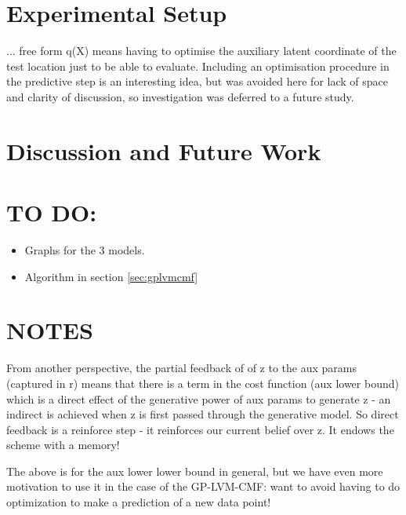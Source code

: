\documentclass{article}
\begin{document}
\section{Experimental Setup}
\label{sec:experiments}

... free form q(X) means having to optimise the auxiliary latent coordinate of the test location just to be able to evaluate. Including an optimisation procedure in the predictive step is an interesting idea, but was avoided here for lack of space and clarity of discussion, so investigation was deferred to a future study.

\section{Discussion and Future Work}
\label{sec:discussion}

\section{TO DO:}
\begin{itemize}
  \item Graphs for the 3 models.
  \item Algorithm in section \ref{sec:gplvmcmf}
\end{itemize}

\section{NOTES}

From another perspective, the partial feedback of of z to the aux params (captured in r) means that there is a term in the cost function (aux lower bound) which is a direct effect of the generative power of aux params to generate z - an indirect is achieved when z is first passed through the generative model. So direct feedback is a reinforce step - it reinforces our current belief over z. It endows the scheme with a memory!

The above is for the aux lower lower bound in general, but we have even more motivation to use it in the case of the GP-LVM-CMF: want to avoid having to do optimization to make a prediction of a new data point!
\end{document}
